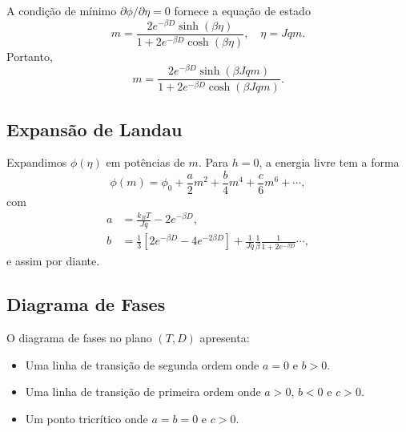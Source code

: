 \documentclass[12pt]{article}
\begin{document}
A condição de mínimo $\partial \phi / \partial \eta = 0$ fornece a equação de estado
\begin{equation}
    m = \frac{2 e^{-\beta D} \sinh(\beta \eta)}{1 + 2 e^{-\beta D} \cosh(\beta \eta)}, \quad \eta = J q m.
\end{equation}
Portanto,
\begin{equation}
    m = \frac{2 e^{-\beta D} \sinh(\beta J q m)}{1 + 2 e^{-\beta D} \cosh(\beta J q m)}.
\end{equation}

\subsection{Expansão de Landau}

Expandimos $\phi(\eta)$ em potências de $m$. Para $h=0$, a energia livre tem a forma
\begin{equation}
    \phi(m) = \phi_0 + \frac{a}{2} m^2 + \frac{b}{4} m^4 + \frac{c}{6} m^6 + \cdots,
\end{equation}
com
\begin{align}
    a &= \frac{k_B T}{J q} - 2 e^{-\beta D}, \\
    b &= \frac{1}{3} \left[ 2 e^{-\beta D} - 4 e^{-2\beta D} \right] + \frac{1}{J q} \frac{1}{\beta} \frac{1}{1 + 2 e^{-\beta D}} \cdots,
\end{align}
e assim por diante.

\subsection{Diagrama de Fases}

O diagrama de fases no plano $(T, D)$ apresenta:
\begin{itemize}
    \item Uma linha de transição de segunda ordem onde $a = 0$ e $b > 0$.
    \item Uma linha de transição de primeira ordem onde $a > 0$, $b < 0$ e $c > 0$.
    \item Um ponto tricrítico onde $a = b = 0$ e $c > 0$.
\end{itemize}
\end{document}
